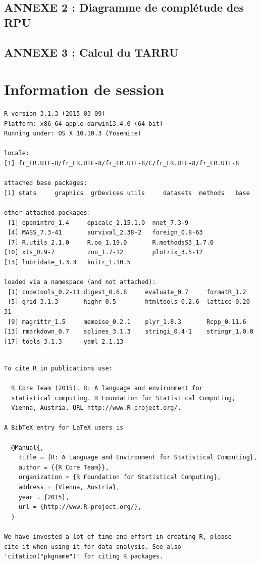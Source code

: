 \documentclass[]{article}
\begin{document}
\subsection{ANNEXE 2 : Diagramme de complétude des
RPU}\label{annexe-2-diagramme-de-completude-des-rpu}

\subsection{ANNEXE 3 : Calcul du TARRU}\label{annexe-3-calcul-du-tarru}

\section{Information de session}\label{information-de-session}

\begin{verbatim}
R version 3.1.3 (2015-03-09)
Platform: x86_64-apple-darwin13.4.0 (64-bit)
Running under: OS X 10.10.3 (Yosemite)

locale:
[1] fr_FR.UTF-8/fr_FR.UTF-8/fr_FR.UTF-8/C/fr_FR.UTF-8/fr_FR.UTF-8

attached base packages:
[1] stats     graphics  grDevices utils     datasets  methods   base     

other attached packages:
 [1] openintro_1.4     epicalc_2.15.1.0  nnet_7.3-9       
 [4] MASS_7.3-41       survival_2.38-2   foreign_0.8-63   
 [7] R.utils_2.1.0     R.oo_1.19.0       R.methodsS3_1.7.0
[10] xts_0.9-7         zoo_1.7-12        plotrix_3.5-12   
[13] lubridate_1.3.3   knitr_1.10.5     

loaded via a namespace (and not attached):
 [1] codetools_0.2-11 digest_0.6.8     evaluate_0.7     formatR_1.2     
 [5] grid_3.1.3       highr_0.5        htmltools_0.2.6  lattice_0.20-31 
 [9] magrittr_1.5     memoise_0.2.1    plyr_1.8.3       Rcpp_0.11.6     
[13] rmarkdown_0.7    splines_3.1.3    stringi_0.4-1    stringr_1.0.0   
[17] tools_3.1.3      yaml_2.1.13     
\end{verbatim}

\begin{verbatim}

To cite R in publications use:

  R Core Team (2015). R: A language and environment for
  statistical computing. R Foundation for Statistical Computing,
  Vienna, Austria. URL http://www.R-project.org/.

A BibTeX entry for LaTeX users is

  @Manual{,
    title = {R: A Language and Environment for Statistical Computing},
    author = {{R Core Team}},
    organization = {R Foundation for Statistical Computing},
    address = {Vienna, Austria},
    year = {2015},
    url = {http://www.R-project.org/},
  }

We have invested a lot of time and effort in creating R, please
cite it when using it for data analysis. See also
'citation("pkgname")' for citing R packages.
\end{verbatim}
\end{document}
